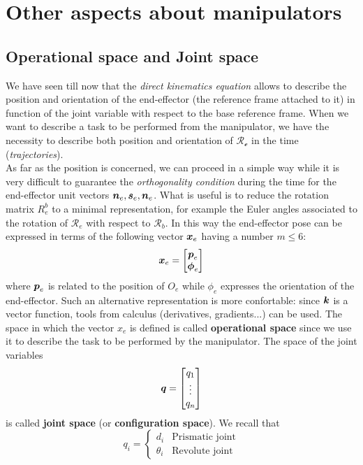 \section{Other aspects about manipulators}

\subsection{Operational space and Joint space}
We have seen till now that the \textit{direct kinematics equation} allows to describe the position and orientation of the end-effector (the reference frame attached to it) in function of the joint variable with respect to the base reference frame. When we want to describe a task to be performed from the manipulator, we have the necessity to describe both position and orientation of $\mathcal{R_e}$ in the time (\textit{trajectories}). \\
As far as the position is concerned, we can proceed in a simple way while it is very difficult to guarantee the \textit{orthogonality condition} during the time for the end-effector unit vectors $\boldsymbol{n}_e, \boldsymbol{s}_e, \boldsymbol{n}_e$. What is useful is to reduce the rotation matrix $R_e^b$ to a minimal representation, for example the Euler angles associated to the rotation of $\mathcal{R}_e$ with respect to $\mathcal{R}_b$. In this way the end-effector pose can be expressed in terms of the following vector $\boldsymbol{x}_e$ having a number $m\le{6}$: 
\begin{equation}
    \boldsymbol{x}_e=\begin{bmatrix}
        \boldsymbol{p}_e\\
        \boldsymbol{\phi}_e
    \end{bmatrix}
\end{equation}
 where $\boldsymbol{p}_e$ is related to the position of $O_e$ while $\phi_e$ expresses the orientation of the end-effector. Such an alternative representation is more confortable: since $\boldsymbol{k}$ is a vector function, tools from calculus (derivatives, gradients...) can be used. The space in which the vector $x_e$ is defined is called \textbf{operational space} since we use it to describe the task to be performed by the manipulator. The space of the joint variables 
 \begin{equation}
    \boldsymbol{q}=\begin{bmatrix}
        q_1\\ \vdots \\ q_n
    \end{bmatrix}
 \end{equation}
is called \textbf{joint space} (or \textbf{configuration space}). We recall that 
\begin{equation}
    q_i=\begin{cases}
        d_i&\text{Prismatic joint}\\
        \theta_i&\text{Revolute joint}
    \end{cases}
\end{equation}

